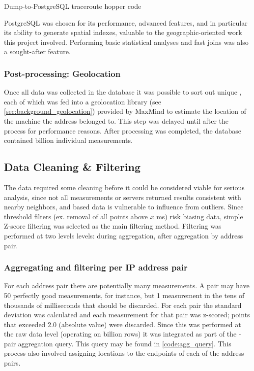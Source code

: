 \begin{code}[h]
    \caption{Dump-to-PostgreSQL traceroute hopper code}
    \label{code:caida_db_dump}
\end{code}

PostgreSQL was chosen for its performance, advanced features, and in particular its ability to generate spatial indexes, valuable to the geographic-oriented work this project involved. Performing basic statistical analyses and fast joins was also a sought-after feature.

\subsubsection{Post-processing: Geolocation}
Once all data was collected in the database it was possible to sort out unique \ips, each of which was fed into a geolocation library (see \cref{sec:background_geolocation}) provided by MaxMind to estimate the location of the machine the \ip address belonged to. This step was delayed until after the \etl process for performance reasons. After processing was completed, the database contained  billion individual \rtt measurements.

\subsection{Data Cleaning \& Filtering}

The data required some cleaning before it could be considered viable for serious analysis, since not all measurements or servers returned results consistent with nearby neighbors, and \rtt based data is vulnerable to influence from outliers. Since threshold filters (ex. removal of all points above $x$ ms) risk biasing data, simple Z-score filtering was selected as the main filtering method. Filtering was performed at two levels levels: during aggregation, after aggregation by \ip address pair.

\subsubsection{Aggregating and filtering per IP address pair}

For each \ip address pair there are potentially many measurements. A pair may have 50 perfectly good measurements, for instance, but 1 measurement in the tens of thousands of milliseconds that should be discarded. For each \ip pair the standard deviation was calculated and each measurement for that pair was z-scored; points that exceeded 2.0 (absolute value) were discarded. Since this was performed at the raw data level (operating on  billion rows) it was integrated as part of the \ip-pair aggregation query. This query may be found in \cref{code:agg_query}. This process also involved assigning locations to the endpoints of each of the \ip address pairs.

